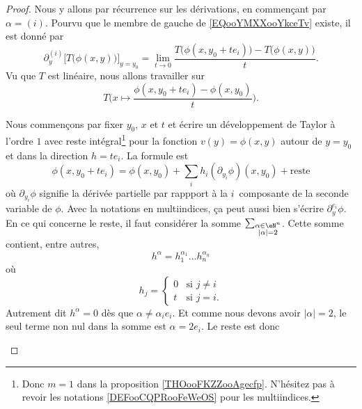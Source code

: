 \begin{proof}
	Nous y allons par récurrence sur les dérivations, en commençant par \( \alpha=(i)\). Pourvu que le membre de gauche de \eqref{EQooYMXXooYkceTv} existe, il est donné par
	\begin{equation}        \label{EQooBHSSooXDrYQh}
		\partial_y^{(i)}\big[ T\big( \phi(x,y) \big) \big]_{y=y_0}=\lim_{t\to 0} \frac{ T\big( \phi(x,y_0+te_i) \big)-T\big( \phi(x,y) \big) }{ t }.
	\end{equation}
	Vu que \( T\) est linéaire, nous allons travailler sur
	\begin{equation}        \label{EQooXEFAooNzLBZx}
		T\Big(x\mapsto \frac{ \phi(x,y_0+te_i)-\phi(x,y_0)}{t} \Big).
	\end{equation}
	\begin{subproof}
		\spitem[Un développement]
		Nous commençons par fixer \( y_0\), \( x\) et \( t\) et écrire un développement de Taylor à l'ordre \( 1\) avec reste intégral\footnote{Donc \( m=1\) dans la proposition \ref{THOooFKZZooAgecfp}. N'hésitez pas à revoir les notations \ref{DEFooCQPRooFeWeOS} pour les multiindices.} pour la fonction \( v(y)=\phi(x,y)\) autour de \( y=y_0\) et dans la direction \( h=te_i\). La formule est
		\begin{equation}		\label{EQooIAXAooWFhNVv}
			\phi(x,y_0+te_i)=\phi(x,y_0)+\sum_ih_i(\partial_{y_i}\phi)(x,y_0)+ \text{reste}
		\end{equation}
		où \( \partial_{y_i}\phi\) signifie la dérivée partielle par rappport à la \( i\)\ieme\ composante de la seconde variable de \( \phi\). Avec la notations en multiindices, ça peut aussi bien s'écrire \( \partial_y^{e_i}\phi\). En ce qui concerne le reste, il faut considérer la somme \( \sum_{\substack{ \alpha\in \eN^n \\ | \alpha |=2 }  }\). Cette somme contient, entre autres,
		\begin{equation}
			h^{\alpha}=h_1^{\alpha_1}\ldots h_n^{\alpha_n}
		\end{equation}
		où
		\begin{equation}
			h_j=\begin{cases}
				0 & \text{si } j\neq i \\
				t & \text{si } j=i.
			\end{cases}
		\end{equation}
		Autrement dit \( h^{\alpha}=0\) dès que \( \alpha\neq \alpha_ie_i\). Et comme nous devons avoir \( | \alpha |=2\), le seul terme non nul dans la somme est \( \alpha=2e_i\). Le reste est donc
		\begin{equation}

\end{equation}
\end{subproof}
\end{proof}
